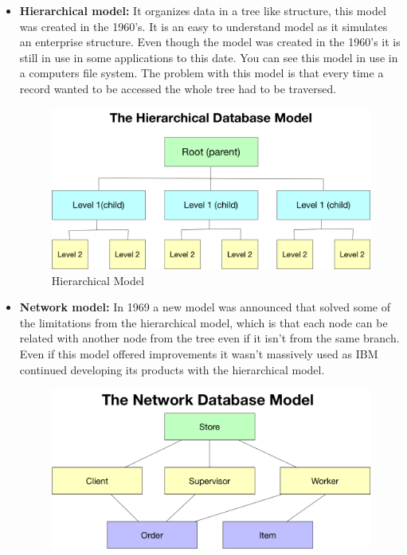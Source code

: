 \begin{itemize}
	\item {\textbf{Hierarchical model:} It organizes data in a tree like structure, this model was created in the 1960’s. It is an easy to understand model as it simulates an enterprise structure. Even though the model was created in the 1960’s it is still in use in some applications to this date. You can see this model in use in a computers file system. The problem with this model is that every time a record wanted to be accessed the whole tree had to be traversed.
	\begin{center}
		\begin{figure}[h!]
			\centering
			\includegraphics[scale=0.32]{./images/3-hierarchical-model}
			\caption{Hierarchical Model}
			\label{hier_model}
		\end{figure}
	\end{center}
	}
	\item {\textbf{Network model:} In 1969 a new model was announced that solved some of the limitations from the hierarchical model, which is that each node can be related with another node from the tree even if it isn’t from the same branch. Even if this model offered improvements it wasn’t massively used as IBM continued developing its products with the hierarchical model.
	\begin{center}
		\begin{figure}[h!]
			\centering
			\includegraphics[scale=0.4]{./images/3-network-model}

\end{figure}
\end{center}}
\end{itemize}
